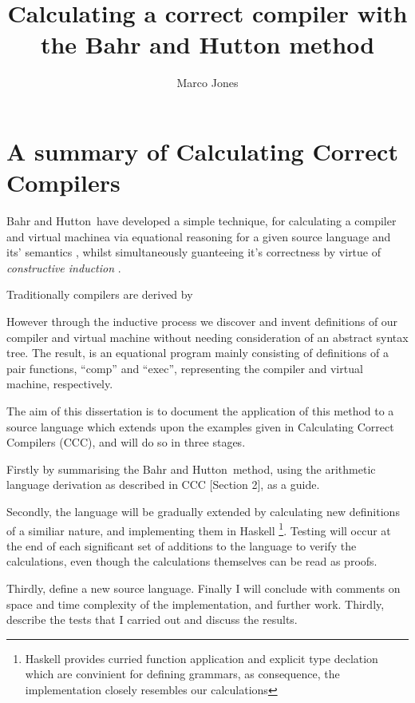 \documentclass {article}
\title{Calculating a correct compiler with the Bahr and Hutton method}
\author{Marco Jones}
\date{}
\begin{document}
\maketitle

\newcommand{\BH}{Bahr and Hutton}
\newcommand{\vm}{virtual machine}

\section{A summary of Calculating Correct Compilers}
\BH\ have developed a simple technique, for
calculating a compiler and virtual machinea via equational reasoning
for a given source language and its' semantics \cite{bandh}, 
whilst simultaneously guanteeing it's correctness by virtue 
of \emph{constructive induction} \cite{backhouse}.

Traditionally compilers are derived by %

However through the inductive process we discover and invent definitions
of our compiler and virtual machine without needing consideration of an 
abstract syntax tree.
The result, is an equational program mainly consisting of
definitions of a pair functions,  ``comp'' and ``exec'',
representing the compiler and virtual machine, respectively.

The aim of this dissertation is to document the
application of this method
to a source language which extends upon the examples given in
Calculating Correct Compilers (CCC),
 and will do so in three stages.

Firstly by summarising the \BH\ method,
using the arithmetic language derivation as described in
CCC [Section 2], as a guide.

Secondly, the language will be gradually extended
by calculating new definitions of a similiar nature,
and implementing them in Haskell
\footnote{Haskell provides curried function application
		and explicit type declation which are
		convinient for defining grammars,
		as consequence, the implementation closely
		resembles our calculations}.
Testing will occur at the end of each
significant set of additions to the language to verify
the calculations, even though the calculations themselves
can be read as proofs\cite[page 14, derivation vs proof]{bandh}.

Thirdly, define a new source language.
Finally I will conclude with comments on space and time complexity
of the implementation, and further work.
Thirdly, describe the tests that I carried out and discuss the results.
\end{document}
